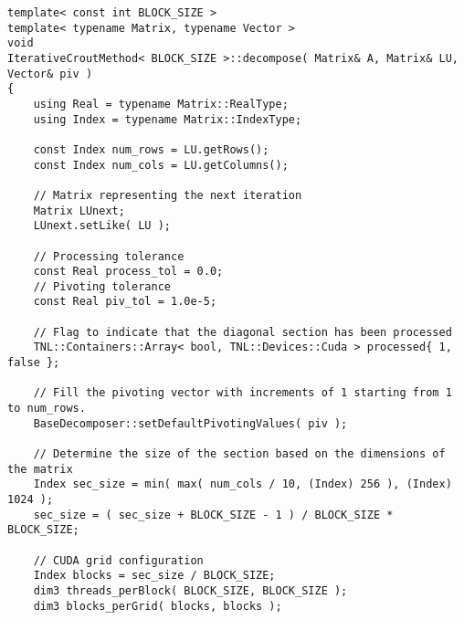 \begin{lstlisting}[caption={Excerpt from the implementation of ICM\textit{x}PP. The template parameter \code{BLOCK\_SIZE} is equivalent to \textit{x} in ICM\textit{x}PP. On input, matrix \code{A} is assumed to contain the values of $\mathbf{A}$, matrix \code{LU} is assumed to contain the initial estimate of the decomposition, and \code{piv} is expected to be appropriately sized and allocated on the Host. On output, matrix \code{LU} contains the values of matrices $\mathbf{L}$ and $\mathbf{U}$ in the format presented in Equation~\ref{Equation:implementation->decomposition-project->implemented-solutions->decomposers->CMPP}, and \code{piv} contains the row permutations. The \code{synchronizeStreams()} function is included below the \code{decompose()} method. The \code{pivotBadElement()} function is shown in Listing~\ref{Listing:ICMxPP-implementation-pivot-bad-element}. The code has been slightly modified for brevity, for example, the checks for appropriate sizing of matrices and vectors have been removed.},label={Listing:ICMxPP-implementation-excerpt}]
template< const int BLOCK_SIZE >
template< typename Matrix, typename Vector >
void
IterativeCroutMethod< BLOCK_SIZE >::decompose( Matrix& A, Matrix& LU, Vector& piv )
{
	using Real = typename Matrix::RealType;
	using Index = typename Matrix::IndexType;
	
	const Index num_rows = LU.getRows();
	const Index num_cols = LU.getColumns();
	
	// Matrix representing the next iteration
	Matrix LUnext;
	LUnext.setLike( LU );
	
	// Processing tolerance
	const Real process_tol = 0.0;
	// Pivoting tolerance
	const Real piv_tol = 1.0e-5;

	// Flag to indicate that the diagonal section has been processed
	TNL::Containers::Array< bool, TNL::Devices::Cuda > processed{ 1, false };
	
	// Fill the pivoting vector with increments of 1 starting from 1 to num_rows.
	BaseDecomposer::setDefaultPivotingValues( piv );
	
	// Determine the size of the section based on the dimensions of the matrix
	Index sec_size = min( max( num_cols / 10, (Index) 256 ), (Index) 1024 );
	sec_size = ( sec_size + BLOCK_SIZE - 1 ) / BLOCK_SIZE * BLOCK_SIZE;
	
	// CUDA grid configuration
	Index blocks = sec_size / BLOCK_SIZE;
	dim3 threads_perBlock( BLOCK_SIZE, BLOCK_SIZE );
	dim3 blocks_perGrid( blocks, blocks );
	

\end{lstlisting}
